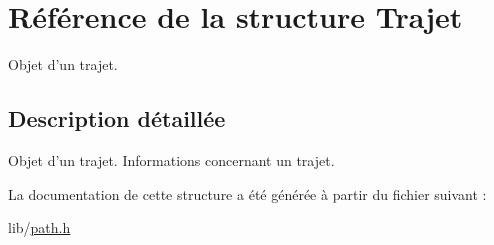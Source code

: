 \hypertarget{structTrajet}{
\section{Référence de la structure Trajet}
\label{structTrajet}
}


Objet d'un trajet.  




\subsection{Description détaillée}
Objet d'un trajet. Informations concernant un trajet. 

La documentation de cette structure a été générée à partir du fichier suivant :\begin{DoxyCompactItemize}
\item 
lib/\hyperlink{path_8h}{path.h}\end{DoxyCompactItemize}
